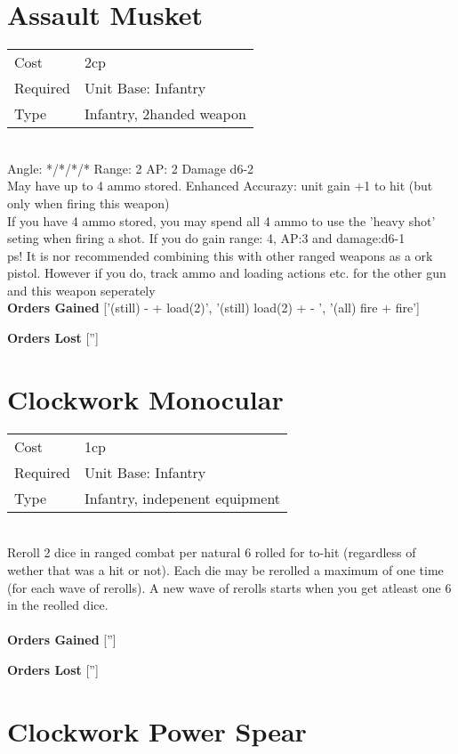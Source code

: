 \pagebreak\section{ Assault Musket }

\begin{tabular}{ll}
    Cost & 2cp \\
    Required & Unit Base: Infantry\\
    Type & Infantry, 2handed weapon\\
\end{tabular}
\ \\
\indent Angle: */*/*/* Range: 2  AP: 2 Damage d6-2 \\
May have up to 4 ammo stored. Enhanced Accurazy: unit gain +1 to hit (but only when firing this weapon)\\ If you have 4 ammo stored, you may spend all 4 ammo to use the 'heavy shot' seting when firing a shot. If you do gain range: 4, AP:3 and damage:d6-1\\ps! It is nor recommended combining this with other ranged weapons as a ork pistol. However if you do, track ammo and loading actions etc. for the other gun and this weapon seperately
\ \\

{\bf Orders Gained}
['(still) - + load(2)', '(still) load(2) + - ', '(all) fire + fire']

{\bf Orders Lost}
['']
\section{ Clockwork Monocular }

\begin{tabular}{ll}
    Cost & 1cp \\
    Required & Unit Base: Infantry\\
    Type & Infantry, indepenent equipment\\
\end{tabular}
\ \\
Reroll 2 dice in ranged combat per natural 6 rolled for to-hit (regardless of wether that was a hit or not). Each die may be rerolled a maximum of one time (for each wave of rerolls). A new wave of rerolls starts when you get atleast one 6 in the reolled dice. \\

\ \\

{\bf Orders Gained}
['']

{\bf Orders Lost}
['']
\section{ Clockwork Power Spear }

